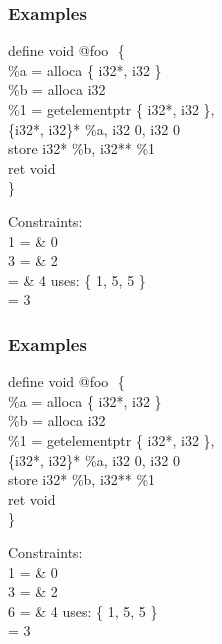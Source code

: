 \documentclass{beamer}
\begin{document}
\begin{frame}[fragile]
\frametitle{Examples}

define void @foo \(\) \{ \\
\hspace{15pt}  \%a = alloca \{ i32*, i32 \} \\
\hspace{15pt}    \%b = alloca i32 \\
\hspace{15pt} \green   \%1 = getelementptr \{ i32*, i32 \}, \\
\hspace{30pt}      \{i32*, i32\}* \%a, i32 0, i32 0 \\
\hspace{15pt}  \normalcolor  store i32* \%b, i32** \%1 \\
\hspace{15pt}    ret void \\
\}

\vspace{15pt}
Constraints:\\
 1 = \& 0 \\
    3 = \& 2 \\
 = \& 4 uses: \{ 1, 5, 5 \} \\
 = 3 \\
\end{frame}


\begin{frame}[fragile]
\frametitle{Examples}

define void @foo \(\) \{ \\
\hspace{15pt}  \%a = alloca \{ i32*, i32 \} \\
\hspace{15pt}    \%b = alloca i32 \\
\hspace{15pt}    \%1 = getelementptr \{ i32*, i32 \}, \\
\hspace{30pt}      \{i32*, i32\}* \%a, i32 0, i32 0 \\
\hspace{15pt} \green   store i32* \%b, i32** \%1 \\
\hspace{15pt}  \normalcolor  ret void \\
\}

\vspace{15pt}
Constraints:\\
 1 = \& 0 \\
    3 = \& 2 \\
    6 = \& 4 uses: \{ 1, 5, 5 \} \\
 = 3 \\
\end{frame}
\end{document}

